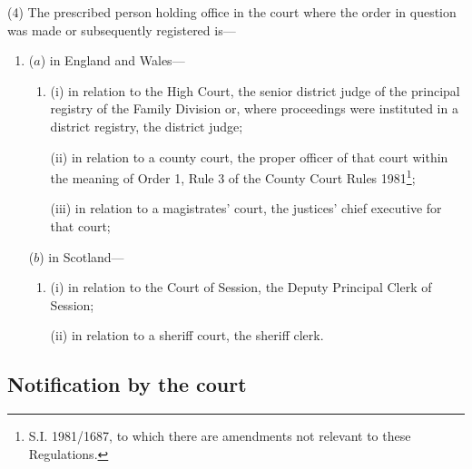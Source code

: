 \documentclass[12pt,a4paper]{article}
\begin{document}
(4) The prescribed person holding office in the court where the order in question was made or subsequently registered is—
\begin{enumerate}\item[]
($a$) in England and Wales—
\begin{enumerate}\item[]
(i) in relation to the High Court, the senior district judge of the principal registry of the Family Division or, where proceedings were instituted in a district registry, the district judge;

(ii) in relation to a county court, the proper officer of that court within the meaning of Order 1, Rule 3 of the County Court Rules 1981\footnote{\frenchspacing S.I. 1981/1687, to which there are amendments not relevant to these Regulations.};

(iii) in relation to a magistrates' court, the 
justices' chief executive for  %
that court;
\end{enumerate}

($b$) in Scotland—
\begin{enumerate}\item[]
(i) in relation to the Court of Session, the Deputy Principal Clerk of Session;

(ii) in relation to a sheriff court, the sheriff clerk.
\end{enumerate}
\end{enumerate}


\subsection[6. Notification by the court]{Notification by the court}
\end{document}
